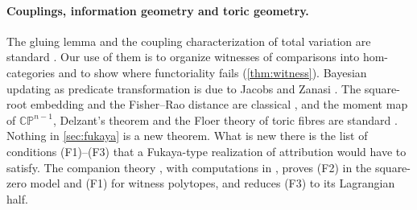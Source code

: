 \documentclass[11pt]{article}
\theoremstyle{definition}
\theoremstyle{remark}
\begin{document}
\paragraph{Couplings, information geometry and toric geometry.} The gluing lemma and the coupling
characterization of total variation are standard \cite{Villani2009,Lindvall1992}. Our use of them is
to organize witnesses of comparisons into hom-categories and to show where functoriality fails
(\cref{thm:witness}). Bayesian updating as predicate transformation is due to Jacobs and Zanasi
\cite{JacobsZanasi2016}. The square-root embedding and the Fisher--Rao distance are classical
\cite{Wootters1981,AmariNagaoka2000}, and the moment map of $\mathbb{CP}^{n-1}$, Delzant's theorem and
the Floer theory of toric fibres are standard \cite{Delzant1988,LermanTolman1997,Cho2004,ChoOh2006,FOOO2010}.
Nothing in \cref{sec:fukaya} is a new theorem. What is new there is the list of conditions
(F1)--(F3) that a Fukaya-type realization of attribution would have to satisfy. The companion theory
\cite{Awasthi-Conditionals}, with computations in \cite{Awasthi-Family}, proves (F2) in the square-zero model and (F1) for
witness polytopes, and reduces (F3) to its Lagrangian half.
\end{document}
